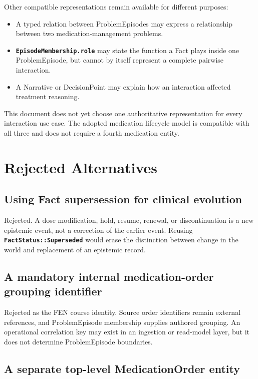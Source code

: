 \documentclass[11pt]{article}
\newcommand{\entity}[1]{\texttt{\textbf{#1}}}
\begin{document}
Other compatible representations remain available for different purposes:

\begin{itemize}[noitemsep]
  \item A typed relation between ProblemEpisodes may express a relationship
    between two medication-management problems.
  \item \entity{EpisodeMembership.role} may state the function a Fact plays
    inside one ProblemEpisode, but cannot by itself represent a complete
    pairwise interaction.
  \item A Narrative or DecisionPoint may explain how an interaction affected
    treatment reasoning.
\end{itemize}

This document does not yet choose one authoritative representation for every
interaction use case. The adopted medication lifecycle model is compatible
with all three and does not require a fourth medication entity.

\section{Rejected Alternatives}
\label{sec:rejected-alternatives}

\subsection{Using Fact supersession for clinical evolution}

Rejected. A dose modification, hold, resume, renewal, or discontinuation is a
new epistemic event, not a correction of the earlier event. Reusing
\entity{FactStatus::Superseded} would erase the distinction between change in
the world and replacement of an epistemic record.

\subsection{A mandatory internal medication-order grouping identifier}

Rejected as the FEN course identity. Source order identifiers remain external
references, and ProblemEpisode membership supplies authored grouping. An
operational correlation key may exist in an ingestion or read-model layer,
but it does not determine ProblemEpisode boundaries.

\subsection{A separate top-level MedicationOrder entity}
\end{document}
